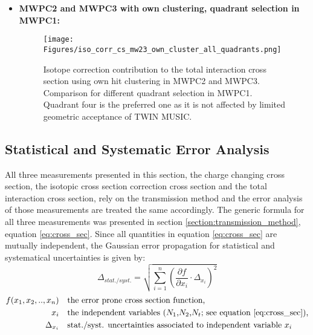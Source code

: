 \begin{itemize}
\item \textbf{MWPC2 and MWPC3 with own clustering, quadrant selection in MWPC1:}\newline
\begin{figure}[h!]
    \centering
    \texttt{[image: Figures/iso\_corr\_cs\_mw23\_own\_cluster\_all\_quadrants.png]}
    \caption{
	Isotope correction contribution to the total interaction cross section using own  hit clustering in MWPC2 and MWPC3. Comparison for different quadrant selection in MWPC1. Quadrant four is the preferred one as it is not affected by limited geometric acceptance of TWIN MUSIC.
     }
    \label{fig:iso_corr_quadrants_own_cluster}
\end{figure}

\end{itemize}

\newpage
\subsection{Statistical and Systematic Error Analysis}
All three measurements presented in this section, the charge changing cross section, the isotopic cross section correction cross section and the total interaction cross section, rely on the transmission method and the error analysis of those measurements are treated the same accordingly. The generic formula for all three measurements was presented in section \ref{section:transmission_method}, equation \ref{eq:cross_sec}.\newline
Since all quantities in equation \ref{eq:cross_sec} are mutually independent, the Gaussian error propagation for statistical and systematical uncertainties is given by:
\begin{equation}
\Delta_{stat./syst.}  = \sqrt{\sum_{i=1}^n \left( \frac{\partial f}{\partial x_i} \cdot \Delta_{x_i} \right)^2 }
\end{equation}
\begin{align*}
	f(x_1,x_2,..,x_n) &\quad \text{the error prone cross section function,} \\
	x_i  &\quad \text{the independent variables ($N_1$,$N_2$,$N_t$; see equation \ref{eq:cross_sec}),} \\
	\Delta_{x_i} &\quad \text{stat./syst. uncertainties associated to independent variable $x_i$}
\end{align*}


